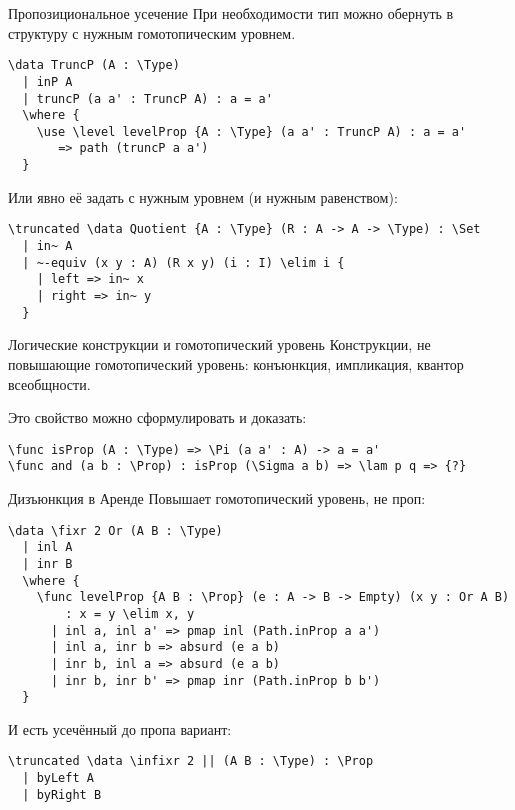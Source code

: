 \documentclass[aspectratio=169,dvipsnames,usenames]{beamer}
\begin{document}
\begin{frame}[fragile]{Пропозициональное усечение}
При необходимости тип можно обернуть в структуру с нужным гомотопическим уровнем.

\small\color[HTML]{025002}
\begin{verbatim}
\data TruncP (A : \Type)
  | inP A
  | truncP (a a' : TruncP A) : a = a'
  \where {
    \use \level levelProp {A : \Type} (a a' : TruncP A) : a = a' 
       => path (truncP a a')
  }
\end{verbatim}
\normalsize\color{black}

Или явно её задать с нужным уровнем (и нужным равенством):

\small\color[HTML]{025002}
\begin{verbatim}
\truncated \data Quotient {A : \Type} (R : A -> A -> \Type) : \Set
  | in~ A
  | ~-equiv (x y : A) (R x y) (i : I) \elim i {
    | left => in~ x
    | right => in~ y
  }
\end{verbatim}
\normalsize\color{black}

\end{frame}

\begin{frame}[fragile]{Логические конструкции и гомотопический уровень}
Конструкции, не повышающие гомотопический уровень: конъюнкция, импликация,
квантор всеобщности.

Это свойство можно сформулировать и доказать:

\small\color[HTML]{025002}
\begin{verbatim}
\func isProp (A : \Type) => \Pi (a a' : A) -> a = a'
\func and (a b : \Prop) : isProp (\Sigma a b) => \lam p q => {?}
\end{verbatim}
\normalsize\color{black}

\end{frame}

\begin{frame}[fragile]{Дизъюнкция в Аренде}
Повышает гомотопический уровень, не проп:
\small\color[HTML]{025002}
\begin{verbatim}
\data \fixr 2 Or (A B : \Type)
  | inl A
  | inr B
  \where {
    \func levelProp {A B : \Prop} (e : A -> B -> Empty) (x y : Or A B) 
        : x = y \elim x, y
      | inl a, inl a' => pmap inl (Path.inProp a a')
      | inl a, inr b => absurd (e a b)
      | inr b, inl a => absurd (e a b)
      | inr b, inr b' => pmap inr (Path.inProp b b')
  }
\end{verbatim}
\normalsize\color{black}

И есть усечённый до пропа вариант:
\small\color[HTML]{025002}
\begin{verbatim}
\truncated \data \infixr 2 || (A B : \Type) : \Prop
  | byLeft A
  | byRight B
\end{verbatim}
\normalsize\color{black}
\end{frame}
\end{document}
